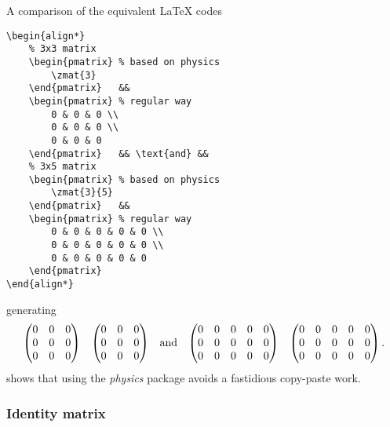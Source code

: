 			A comparison of the equivalent \LaTeX{} codes
\begin{lstlisting}[language={[LaTeX]TeX}]
\begin{align*}
	% 3x3 matrix
	\begin{pmatrix} % based on physics
		\zmat{3}
	\end{pmatrix}	&&
	\begin{pmatrix} % regular way
		0 & 0 & 0 \\
		0 & 0 & 0 \\
		0 & 0 & 0
	\end{pmatrix}	&& \text{and} &&
	% 3x5 matrix
	\begin{pmatrix} % based on physics
		\zmat{3}{5}
	\end{pmatrix}	&&
	\begin{pmatrix} % regular way
		0 & 0 & 0 & 0 & 0 \\
		0 & 0 & 0 & 0 & 0 \\
		0 & 0 & 0 & 0 & 0
	\end{pmatrix} 
\end{align*}
\end{lstlisting}
			generating
			\begin{align*}
				\begin{pmatrix} %
					\zmat{3}
				\end{pmatrix}	&&
				\begin{pmatrix} %
					0 & 0 & 0 \\
					0 & 0 & 0 \\
					0 & 0 & 0
				\end{pmatrix}	&& \text{and} &&
				\begin{pmatrix} %
					\zmat{3}{5}
				\end{pmatrix}	&&
				\begin{pmatrix} %
					0 & 0 & 0 & 0 & 0 \\
					0 & 0 & 0 & 0 & 0 \\
					0 & 0 & 0 & 0 & 0
				\end{pmatrix}.
			\end{align*}
			shows that using the \emph{physics} package avoids a fastidious copy-paste work.
		
		
		
		\subsubsection{Identity matrix}
		
